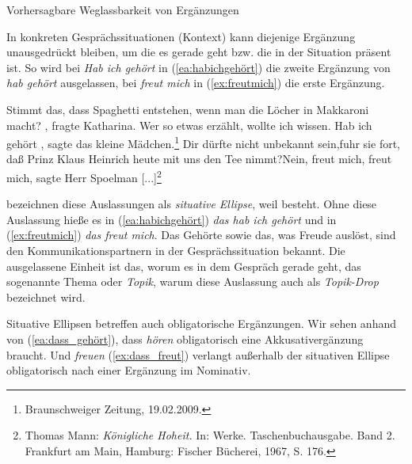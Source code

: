 \begin{Exkurs}{Vorhersagbare Weglassbarkeit von Ergänzungen}\label{Exkurs:Weglassbarkeit}

In konkreten Gesprächssituationen (Kontext) kann diejenige Ergänzung unausgedrückt bleiben, um die es gerade geht bzw. die in der Situation präsent ist. So wird bei \textit{Hab ich gehört} in (\ref{ea:habichgehört}) die zweite Ergänzung von \textit{hab gehört} ausgelassen, bei \textit{freut mich} in (\ref{ex:freutmich}) die erste Ergänzung.  

\ea \label{ea:SitEllipse}
\ea\label{ea:habichgehört} \frqq Stimmt das, dass Spaghetti entstehen, wenn man die Löcher in Makkaroni macht? \flqq, fragte Katharina. Wer so etwas erzählt, wollte ich wissen. \frqq Hab ich gehört \flqq, sagte das kleine Mädchen.\footnote{Braunschweiger Zeitung, 19.02.2009.}
\ex \label{ex:freutmich} \frqq Dir dürfte nicht unbekannt sein,\flqq fuhr sie fort, \frqq daß Prinz Klaus Heinrich heute mit uns den Tee nimmt?\flqq \frqq Nein, freut mich, freut mich\flqq, sagte Herr Spoelman [...]\footnote{Thomas Mann: \textit{Königliche Hoheit.} In: Werke. Taschenbuchausgabe. Band 2. Frankfurt am Main, Hamburg: Fischer Bücherei, 1967, S. 176.}
\z 
\z 

\citet[413, 418]{ZifHoffStr1997} bezeichnen diese Auslassungen als \textit{situative Ellipse}, weil  besteht. Ohne diese Auslassung hieße es in (\ref{ea:habichgehört}) \textit{das hab ich gehört} und in (\ref{ex:freutmich}) \textit{das freut mich}. Das Gehörte sowie das, was Freude auslöst, sind den Kommunikationspartnern in der Gesprächssituation bekannt. Die ausgelassene Einheit ist das, worum es in dem Gespräch gerade geht, das sogenannte Thema oder \textit{Topik}, warum diese Auslassung auch als \textit{Topik-Drop} bezeichnet wird.

Situative Ellipsen betreffen auch obligatorische Ergänzungen. Wir sehen anhand von (\ref{ea:dass_gehört}), dass \textit{hören} obligatorisch eine Akkusativergänzung braucht. Und \textit{freuen} (\ref{ex:dass_freut}) verlangt außerhalb der situativen Ellipse obligatorisch nach einer Ergänzung im Nominativ. 

\ea \label{ea:Notwendigkeit:MF}
\label{ea:dass_gehört}
\label{ex:dass_freut}
\z 
\z 


\end{Exkurs}
